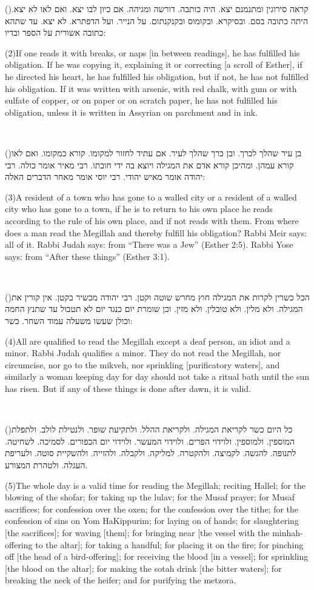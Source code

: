 \documentclass[12pt, openany]{book}
\newcommand{\sethebfont}{
\fontsize{10.5pt}{13.1pt} \selectfont
}
\newcommand{\LTRmark}{‎}
\newcommand{\hebeng}[2]{
	{\sethebfont #1}
	
	{\beginL\englishfont\sethebfont{\raggedright #2 \hfill} \LTRmark\endL}
	
	\vspace{\baselineskip}
}
\newcommand{\vsnum}[1]{(\hebrewnumeral{#1})\space}
\newcommand{\vsnumeng}[1]{(#1)\space}
\begin{document}
\hebeng{\vsnum{2}קראה סירוגין ומתנמנם יצא. היה כותבה. דורשה ומגיהה. אם כיון לבו יצא. ואם לאו לא יצא. היתה כתובה בסם. ובסיקרא. ובקומוס ובקנקנתום. על הנייר. ועל הדפתרא. לא יצא. עד שתהא כתובה אשורית על הספר ובדיו: }{\vsnumeng{2}If one reads it with breaks, or naps {[in between readings]}, he has fulfilled his obligation. If he was copying it, explaining it or correcting {[a scroll of Esther]}, if he directed his heart, he has fulfilled his obligation, but if not, he has not fulfilled his obligation. If it was written with arsenic, with red chalk, with gum or with sulfate of copper, or on paper or on scratch paper, he has not fulfilled his obligation, unless it is written in Assyrian on parchment and in ink.}%

\hebeng{\vsnum{3}בן עיר שהלך לכרך. ובן כרך שהלך לעיר. אם עתיד לחזור למקומו. קורא כמקומו. ואם לאו קורא עמהן. ומהיכן קורא אדם את המגילה ויוצא בה ידי חובתו. רבי מאיר אומר כולה. רבי יהודה אומר מאיש יהודי. רבי יוסי אומר מאחר הדברים האלה: }{\vsnumeng{3}A resident of a town who has gone to a walled city or a resident of a walled city who has gone to a town, if he is to return to his own place he reads according to the rule of his own place, and if not reads with them. From where does a man read the Megillah and thereby fulfill his obligation? Rabbi Meir says: all of it. Rabbi Judah says: from “There was a Jew” (Esther 2:5). Rabbi Yose says: from “After these things” (Esther 3:1).}%

\hebeng{\vsnum{4}הכל כשרין לקרות את המגילה חוץ מחרש שוטה וקטן. רבי יהודה מכשיר בקטן. אין קורין את המגילה. ולא מלין. ולא טובלין. ולא מזין. וכן שומרת יום כנגד יום לא תטבול עד שתנץ החמה וכולן שעשו משעלה עמוד השחר. כשר: }{\vsnumeng{4}All are qualified to read the Megillah except a deaf person, an idiot and a minor. Rabbi Judah qualifies a minor. They do not read the Megillah, nor circumcise, nor go to the mikveh, nor sprinkling {[purificatory waters]}, and similarly a woman keeping day for day should not take a ritual bath until the sun has risen. But if any of these things is done after dawn, it is valid.}%

\hebeng{\vsnum{5}כל היום כשר לקריאת המגילה. ולקריאת ההלל. ולתקיעת שופר. ולנטילת לולב. ולתפלת המוספין. ולמוספין. ולוידוי הפרים. ולוידוי המעשר. ולוידוי יום הכפורים. לסמיכה. לשחיטה. לתנופה. להגשה. לקמיצה. ולהקטרה. למליקה. ולקבלה. ולהזייה. ולהשקיית סוטה. ולעריפת העגלה. ולטהרת המצורע. }{\vsnumeng{5}The whole day is a valid time for reading the Megillah; reciting Hallel; for the blowing of the shofar; for taking up the lulav; for the Musaf prayer; for Musaf sacrifices; for confession over the oxen; for the confession over the tithe; for the confession of sins on Yom HaKippurim; for laying on of hands; for slaughtering {[the sacrifices]}; for waving {[them]}; for bringing near {[the vessel with the minhah-offering to the altar]}; for taking a handful; for placing it on the fire; for pinching off {[the head of a bird-offering]}; for receiving the blood {[in a vessel]}; for sprinkling {[the blood on the altar]}; for making the sotah drink {[the bitter waters]}; for breaking the neck of the heifer; and for purifying the metzora.}%
\end{document}

